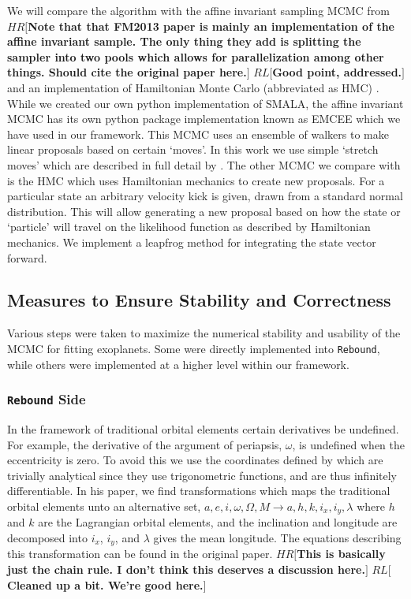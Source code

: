 \documentclass{aa}
\def\memohr#1{\color{blue}$HR[${\bf #1}$]$ \color{black}}
\def\memorl#1{\color{gray}$RL[${\bf #1}$]$ \color{black}}
\begin{document}
We will compare the algorithm with the affine invariant sampling MCMC from \cite{Goodman2010} \memohr{Note that that FM2013 paper is mainly an implementation of the affine invariant sample. The only thing they add is splitting the sampler into two pools which allows for parallelization among other things. Should cite the original paper here.} \memorl{Good point, addressed.} and an implementation of Hamiltonian Monte Carlo (abbreviated as HMC) \citep{Duane1987}.
While we created our own python implementation of SMALA, the affine invariant MCMC has its own python package implementation known as EMCEE which we have used in our framework. 
This MCMC uses an ensemble of walkers to make linear proposals based on certain `moves'. 
In this work we use simple `stretch moves' which are described in full detail by \cite{Foreman-Mackey2013}. 
The other MCMC we compare with is the HMC which uses Hamiltonian mechanics to create new proposals. 
For a particular state an arbitrary velocity kick is given, drawn from a standard normal distribution. 
This will allow generating a new proposal based on how the state or `particle' will travel on the likelihood function as described by Hamiltonian mechanics. We implement a leapfrog method for integrating the state vector forward.

\subsection{Measures to Ensure Stability and Correctness}
Various steps were taken to maximize the numerical stability and usability of the MCMC for fitting exoplanets. Some were directly implemented into \texttt{Rebound}, while others were implemented at a higher level within our framework.

\subsubsection{\texttt{Rebound} Side}\label{analytical}
In the framework of traditional orbital elements certain derivatives be undefined. For example, the derivative of the argument of periapsis, $\omega$, is undefined when the eccentricity is zero. 
To avoid this we use the coordinates defined by \cite{Pl2009} which are trivially analytical since they use trigonometric functions, and are thus infinitely differentiable. 
In his paper, we find transformations which maps the traditional orbital elements unto an alternative set, $a, e, i, \omega, \Omega, M \to a, h, k, i_x, i_y, \lambda$ where $h$ and $k$ are the Lagrangian orbital elements, and the inclination and longitude are decomposed into $i_x$, $i_y$, and $\lambda$ gives the mean longitude. 
The equations describing this transformation can be found in the original paper. 
\memohr{This is basically just the chain rule. I don't think this deserves a discussion here.}
\memorl{Cleaned up a bit. We're good here.}
\end{document}
